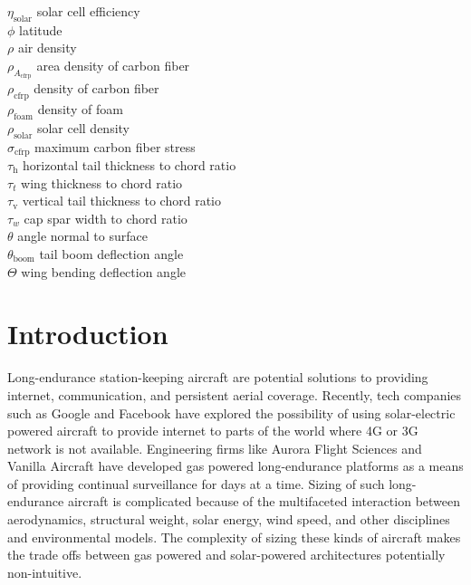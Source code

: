 \begin{multicols}{2}
\begin{tabbing}
$\eta_{\text{solar}}$ \> solar cell efficiency \\
$\phi$ \> latitude \\
$\rho$ \> air density \\ %
$\rho_{A_{\text{cfrp}}}$ \> area density of carbon fiber \\ %
$\rho_{\text{cfrp}}$ \> density of carbon fiber \\ %
$\rho_{\text{foam}}$ \> density of foam \\ %
$\rho_{\text{solar}}$ \> solar cell density \\ %
$\sigma_{\text{cfrp}}$ \> maximum carbon fiber stress \\ %
$\tau_{\text{h}}$ \> horizontal tail thickness to chord ratio \\
$\tau_t$ \> wing thickness to chord ratio \\
$\tau_{\text{v}}$ \> vertical tail thickness to chord ratio \\
$\tau_w$ \> cap spar width to chord ratio \\
$\theta$ \> angle normal to surface \\
$\theta_{\text{boom}}$ \> tail boom deflection angle \\
$\Theta$ \> wing bending deflection angle 
 \end{tabbing}

\end{multicols}

\section{Introduction}

Long-endurance station-keeping aircraft are potential solutions to providing internet, communication, and persistent aerial coverage. 
Recently, tech companies such as Google\cite{googletitan} and Facebook\cite{aquila} have explored the possibility of using solar-electric powered aircraft to provide internet to parts of the world where 4G or 3G network is not available. 
Engineering firms like Aurora Flight Sciences\cite{orion} and Vanilla Aircraft\cite{vanilla} have developed gas powered long-endurance platforms as a means of providing continual surveillance for days at a time.  
Sizing of such long-endurance aircraft is complicated because of the multifaceted interaction between aerodynamics, structural weight, solar energy, wind speed, and other disciplines and environmental models.
The complexity of sizing these kinds of aircraft makes the trade offs between gas powered and solar-powered architectures potentially non-intuitive. 

